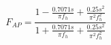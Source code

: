 \begin{equation}
F_{AP} = \frac{1 - \frac{0.7071 s}{\pi f_{h}} + \frac{0.25 s^{2}}{\pi^{2} f_{h}^{2}}}{1 + \frac{0.7071 s}{\pi f_{h}} + \frac{0.25 s^{2}}{\pi^{2} f_{h}^{2}}}
\end{equation}

